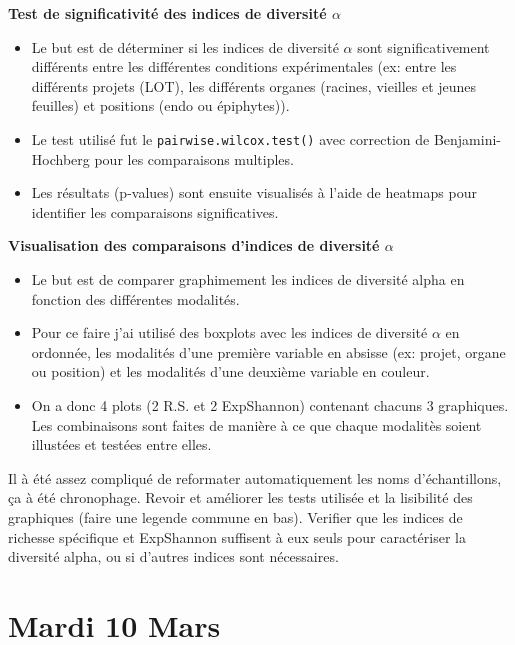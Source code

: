 \documentclass[12pt,a4paper]{report}
\begin{document}
\begin{Méthodologie}{}
    \textbf{Test de significativité des indices de diversité $\alpha$}
    \begin{itemize}
        \item Le but est de déterminer si les indices de diversité $\alpha$ sont significativement différents entre les différentes conditions expérimentales (ex: entre les différents projets (LOT), les différents organes (racines, vieilles et jeunes feuilles) et positions (endo ou épiphytes)).
        \item Le test utilisé fut le \texttt{pairwise.wilcox.test()} avec correction de Benjamini-Hochberg pour les comparaisons multiples.
        \item Les résultats (p-values) sont ensuite visualisés à l'aide de heatmaps pour identifier les comparaisons significatives.
    \end{itemize}  
        \textbf{Visualisation des comparaisons d'indices de diversité $\alpha$}
    \begin{itemize}
        \item Le but est de comparer graphimement les indices de diversité alpha en fonction des différentes modalités.
        \item Pour ce faire j'ai utilisé des boxplots avec les indices de diversité $\alpha$ en ordonnée, les modalités d'une première variable en absisse (ex: projet, organe ou position) et les modalités d'une deuxième variable en couleur.
        \item On a donc 4 plots (2 R.S. et 2 ExpShannon) contenant chacuns 3 graphiques. Les combinaisons sont faites de manière à ce que chaque modalitès soient illustées et testées entre elles.
    \end{itemize}  

\end{Méthodologie}

\vspace{0.5cm}

\begin{attention}
    Il à été assez compliqué de reformater automatiquement les noms d'échantillons, ça à été chronophage.
    Revoir et améliorer les tests utilisée et la lisibilité des graphiques (faire une legende commune en bas).
    Verifier que les indices de richesse spécifique et ExpShannon suffisent à eux seuls pour caractériser la diversité alpha, ou si d'autres indices sont nécessaires.
\end{attention}

\section{Mardi 10 Mars}
\end{document}
